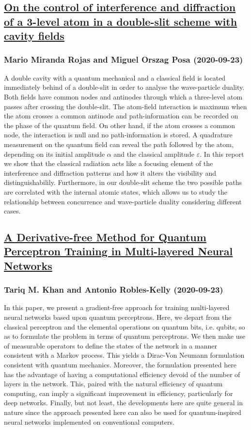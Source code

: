 {\subsection*{\href{http://arxiv.org/abs/2009.10895v1}{On the control of interference and diffraction of a 3-level atom in a  double-slit scheme with cavity fields}}
\subsubsection*{Mario Miranda Rojas and Miguel Orszag Posa (2020-09-23)}
A double cavity with a quantum mechanical and a classical field is located
immediately behind of a double-slit in order to analyse the wave-particle
duality. Both fields have common nodes and antinodes through which a
three-level atom passes after crossing the double-slit. The atom-field
interaction is maximum when the atom crosses a common antinode and
path-information can be recorded on the phase of the quantum field. On other
hand, if the atom crosses a common node, the interaction is null and no
path-information is stored. A quadrature measurement on the quantum field can
reveal the path followed by the atom, depending on its initial amplitude
$\alpha$ and the classical amplitude $\varepsilon$. In this report we show that
the classical radiation acts like a focusing element of the interference and
diffraction patterns and how it alters the visibility and distinguishabilily.
Furthermore, in our double-slit scheme the two possible paths are correlated
with the internal atomic states, which allows us to study the relationship
between concurrence and wave-particle duality considering different cases.

\subsection*{\href{http://arxiv.org/abs/2009.13264v1}{A Derivative-free Method for Quantum Perceptron Training in  Multi-layered Neural Networks}}
\subsubsection*{Tariq M. Khan and Antonio Robles-Kelly (2020-09-23)}
In this paper, we present a gradient-free approach for training multi-layered
neural networks based upon quantum perceptrons. Here, we depart from the
classical perceptron and the elemental operations on quantum bits, i.e. qubits,
so as to formulate the problem in terms of quantum perceptrons. We then make
use of measurable operators to define the states of the network in a manner
consistent with a Markov process. This yields a Dirac-Von Neumann formulation
consistent with quantum mechanics. Moreover, the formulation presented here has
the advantage of having a computational efficiency devoid of the number of
layers in the network. This, paired with the natural efficiency of quantum
computing, can imply a significant improvement in efficiency, particularly for
deep networks. Finally, but not least, the developments here are quite general
in nature since the approach presented here can also be used for
quantum-inspired neural networks implemented on conventional computers.

}
